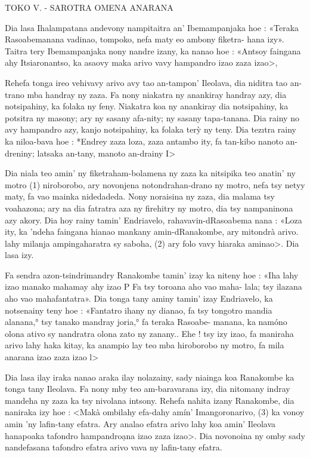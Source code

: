 TOKO V. - SAROTRA OMENA ANARANA

Dia lasa Ihalampatana andevony nampitaitra an' Ibemampanjaka hoe :
«Teraka Rasoabemanana vadinao, tompoko, nefa maty eo ambony fiketra-
hana izy». Taitra tery Ibemampanjaka nony nandre izany, ka nanao hoe :
«Antsoy faingana ahy Itsiaronantso, ka asaovy maka arivo vavy hampandro
izao zaza izao>,

Rehefa tonga ireo vehivavy arivo avy tao an-tampon' Ileolava, dia
niditra tao an-trano mba handray ny zaza. Fa nony niakatra ny anankiray
handray azy, dia notsipahiny, ka folaka ny feny. Niakatra koa ny anankiray
dia notsipahiny, ka potsitra ny masony; ary ny sasany afa-nity; ny sasany
tapa-tanana. Dia rainy no avy hampandro azy, kanjo notsipahiny, ka folaka
terỳ ny teny. Dia tezıtra rainy ka niloa-bava hoe : *Endrey zaza loza,
zaza antambo ity, fa tan-kibo nanoto an-dreniny; latsaka an-tany, manoto
an-drainy I>

Dia niala teo amin' ny fiketraham-bolamena ny zaza ka nitsipika teo
anatin' ny motro (1) niroborobo, ary novonjena notondrahan-drano ny
motro, nefa tsy netyy maty, fa vao mainka nidedadeda. Nony noraisina ny
zaza, dia malama tsy voahazona; ary na dia fatratra aza ny firehitry ny
motro, dia tsy nampaninona azy akory. Dia hoy rainy tamin' Endriavelo,
rahavavin-dRasoabema nana : «Loza ity, ka 'ndeha faingana hianao mankany
amin-dRanakombe, ary mitondrà arivo. lahy milanja ampingaharatra sy
saboha, (2) ary folo vavy hiaraka aminao>. Dia lasa izy.

Fa sendra azon-tsindrimandry Ranakombe tamin' izay ka niteny hoe :
«Iha lahy izao manako mahamay ahy izao P Fa tsy toroana aho vao maha-
lala; tsy ilazana aho vao mahafantatra». Dia tonga tany aminy tamin' izay
Endriavelo, ka notsenainy teny hoe : «Fantatro ihany ny dianao, fa tsy
tongotro mandia alanana,° tsy tanako mandray joria,° fa teraka Rasoabe-
manana, ka namóno olona ativo sy nandratra olona zato ny zanany.. Ehe !
tsy izy izao, fa maniraha arivo lahy haka kitay, ka anampio lay teo mba
hiroborobo ny motro, fa mila anarana izao zaza izao l>

Dia lasa ilay iraka nanao araka ilay nolazainy, sady niainga koa
Ranakombe ka tonga tany Ileolava. Fa nony mby teo am-baravarana izy,
dia nitomany indray mandeha ny zaza ka tsy nivolana intsony. Rehefa
nahita izany Ranakombe, dia naniraka izy hoe : <Makà ombilahy efa-dahy
amín' Imangoronarivo, (3) ka vonoy amin 'ny lafin-tany efatra. Ary analao
efatra arivo lahy koa amin' Ileolava hanapoaka tafondro hampandroạna
izao zaza izao>. Dia novonoina ny omby sady nandefasana tafondro efatra
arivo vava ny lafin-tany efatra.

